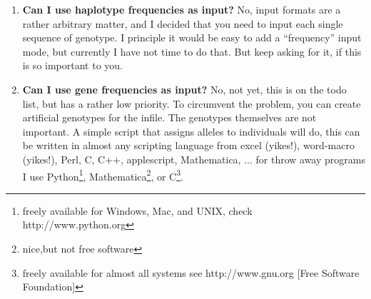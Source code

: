 \begin{enumerate}
\item{\bfseries Can I use haplotype frequencies as input?}
No, input formats are a rather arbitrary matter, and I decided that
you need to input each single sequence of genotype. I principle it
would be easy to add a ``frequency'' input mode, but currently
I have not time to do that. But keep asking for it, if this is so
important to you.
\item{\bfseries Can I use gene frequencies as input?}
No, not yet, this is on the todo list, but has a rather low
priority. To circumvent the problem, you can create artificial 
genotypes for the infile. The genotypes themselves are not important.
A simple script that assigns alleles to individuals will do, this
can be written in almost any scripting language from excel (yikes!),
word-macro (yikes!), Perl, C, C++, applescript, Mathematica, ... for throw away programs I use Python\footnote{freely available for Windows, Mac, and UNIX, check http://www.python.org}, Mathematica\footnote{nice,but not free software},  or C\footnote{freely available for almost all systems see http://www.gnu.org [Free Software Foundation]}.
\end{enumerate}

